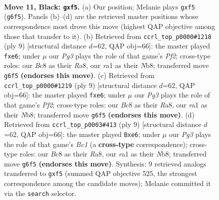 \documentclass[11pt]{article}
\begin{document}
\clearpage

\begin{figure}[p]\centering
\begin{subfigure}{0.46\textwidth}\centering
\resizebox{\linewidth}{!}{%
\newchessgame
\chessboard[
  setfen={r1bqnr1k/pp1pppbp/6p1/2p2P2/2P5/2N3P1/PP1P1PBP/R1BQNRK1 b - - 0 11},
  showmover=false,
  pgfstyle=straightmove, color=movearrow, markmove={g6-f5}
]}
\caption{}
\end{subfigure}\hfill
\begin{subfigure}{0.46\textwidth}\centering
\resizebox{\linewidth}{!}{%
\newchessgame
\chessboard[
  setfen={rnbqkb1r/pp3ppp/3pPn2/2p5/2P5/5N2/PP2PPPP/RNBQKB1R b KQkq - 0 5},
  showmover=false,
  pgfstyle=straightmove, color=movearrow, markmove={f7-e6}
]}
\caption{}
\end{subfigure}
\\[4pt]
\begin{subfigure}{0.46\textwidth}\centering
\resizebox{\linewidth}{!}{%
\newchessgame
\chessboard[
  setfen={rnbqkb1r/pp3ppp/3pPn2/2p5/2P5/5N2/PP2PPPP/RNBQKB1R b KQkq - 0 5},
  showmover=false,
  pgfstyle=straightmove, color=movearrow, markmove={f7-e6}
]}
\caption{}
\end{subfigure}\hfill
\begin{subfigure}{0.46\textwidth}\centering
\resizebox{\linewidth}{!}{%
\newchessgame
\chessboard[
  setfen={rnbqkb1r/pp3ppp/3pPn2/2p5/2P5/5N2/PP2PPPP/RNBQKB1R b KQkq - 0 5},
  showmover=false,
  pgfstyle=straightmove, color=movearrow, markmove={c8-e6}
]}
\caption{}
\end{subfigure}
\caption{\textbf{Move 11, Black: \texttt{gxf5}.} (a) Our position; Melanie plays \texttt{gxf5} (\texttt{g6f5}). Panels (b)--(d) are the retrieved master positions whose correspondence most drove this move (highest QAP objective among those that transfer to it). (b) Retrieved from \texttt{ccrl\_top\_p0000\#1218} (ply 9) [structural distance $d$=62, QAP obj=66]: the master played \texttt{fxe6}; under $\mu$ our \emph{Pg3} plays the role of that game's \emph{Pf2}; cross-type roles: our \emph{B}c8 as their \emph{R}a8, our \emph{r}a1 as their \emph{N}b8; transferred move \texttt{g6f5} \textbf{(endorses this move)}. (c) Retrieved from \texttt{ccrl\_top\_p0000\#1219} (ply 9) [structural distance $d$=62, QAP obj=66]: the master played \texttt{fxe6}; under $\mu$ our \emph{Pg3} plays the role of that game's \emph{Pf2}; cross-type roles: our \emph{B}c8 as their \emph{R}a8, our \emph{r}a1 as their \emph{N}b8; transferred move \texttt{g6f5} \textbf{(endorses this move)}. (d) Retrieved from \texttt{ccrl\_top\_p0003\#413} (ply 9) [structural distance $d$=62, QAP obj=66]: the master played \texttt{Bxe6}; under $\mu$ our \emph{Pg3} plays the role of that game's \emph{Bc1} (a \textbf{cross-type} correspondence); cross-type roles: our \emph{B}c8 as their \emph{R}a8, our \emph{r}a1 as their \emph{N}b8; transferred move \texttt{g6f5} \textbf{(endorses this move)}. Synthesis: 9 retrieved analogs transferred to \texttt{gxf5} (summed QAP objective 525, the strongest correspondence among the candidate moves); Melanie committed it via the \texttt{search} selector.}
\label{fig:thought-m21}
\end{figure}
\end{document}

